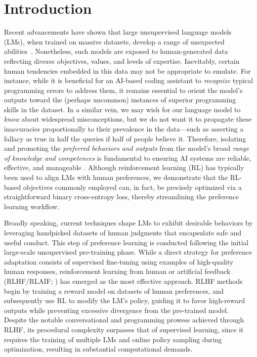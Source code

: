 \section{Introduction}
Recent advancements have shown that large unsupervised language models (LMs), when trained on massive datasets, develop a range of unexpected abilities~\citep{chowdhery2022palm, brown2020language, touvron2023llama, bubeck2023sparks}. Nonetheless, such models are exposed to human-generated data reflecting diverse objectives, values, and levels of expertise. Inevitably, certain human tendencies embedded in this data may not be appropriate to emulate. For instance, while it is beneficial for an AI-based coding assistant to \textit{recognize} typical programming errors to address them, it remains essential to orient the model’s outputs toward the (perhaps uncommon) instances of superior programming skills in the dataset. In a similar vein, we may wish for our language model to \textit{know} about widespread misconceptions, but we do not want it to propagate these inaccuracies proportionally to their prevalence in the data—such as asserting a fallacy as true in half the queries if half of people believe it. Therefore, isolating and promoting the \emph{preferred behaviors and outputs} from the model’s broad \textit{range of knowledge and competences} is fundamental to ensuring AI systems are reliable, effective, and manageable \citep{ouyang2022training}. Although reinforcement learning (RL) has typically been used to align LMs with human preferences, we demonstrate that the RL-based objectives commonly employed can, in fact, be precisely optimized via a straightforward binary cross-entropy loss, thereby streamlining the preference learning workflow.

Broadly speaking, current techniques shape LMs to exhibit desirable behaviors by leveraging handpicked datasets of human judgments that encapsulate safe and useful conduct. This step of preference learning is conducted following the initial large-scale unsupervised pre-training phase. While a direct strategy for preference adaptation consists of supervised fine-tuning using examples of high-quality human responses, reinforcement learning from human or artificial feedback (RLHF/RLAIF; \citep{christiano2017deep, bai2022constitutional}) has emerged as the most effective approach. RLHF methods begin by training a reward model on datasets of human preferences, and subsequently use RL to modify the LM’s policy, guiding it to favor high-reward outputs while preventing excessive divergence from the pre-trained model. Despite the notable conversational and programming prowess achieved through RLHF, its procedural complexity surpasses that of supervised learning, since it requires the training of multiple LMs and online policy sampling during optimization, resulting in substantial computational demands.

